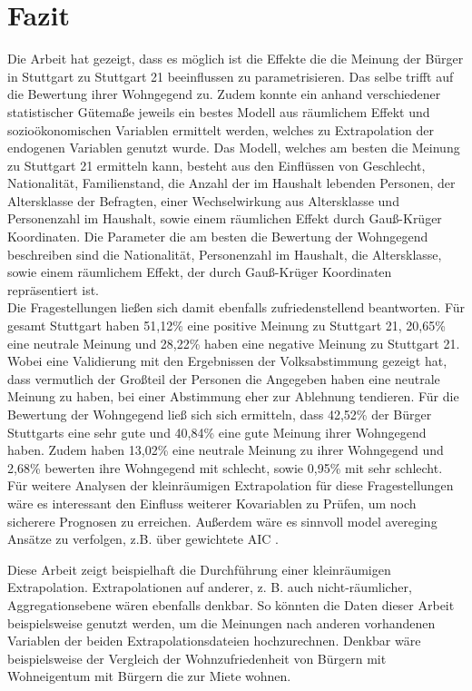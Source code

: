 \documentclass{Vorlage}
\begin{document}
\section{Fazit}
Die Arbeit hat gezeigt, dass es möglich ist die Effekte die die Meinung der Bürger in Stuttgart zu Stuttgart 21 beeinflussen zu parametrisieren. Das selbe trifft auf die Bewertung ihrer Wohngegend zu. Zudem konnte ein anhand verschiedener statistischer Gütemaße jeweils ein bestes Modell aus räumlichem Effekt und sozioökonomischen Variablen ermittelt werden, welches zu Extrapolation der endogenen Variablen genutzt wurde. Das Modell, welches am besten die Meinung zu Stuttgart 21 ermitteln kann, besteht aus den Einflüssen von Geschlecht, Nationalität, Familienstand, die Anzahl der im Haushalt lebenden Personen, der Altersklasse der Befragten, einer Wechselwirkung aus Altersklasse und  Personenzahl im Haushalt, sowie einem räumlichen Effekt durch Gauß-Krüger Koordinaten. Die Parameter die am besten die Bewertung der Wohngegend beschreiben sind die Nationalität, Personenzahl im Haushalt, die Altersklasse, sowie einem räumlichem Effekt, der durch Gauß-Krüger Koordinaten repräsentiert ist. \\
Die Fragestellungen ließen sich damit ebenfalls zufriedenstellend beantworten. Für gesamt Stuttgart haben 51,12\% eine positive Meinung zu Stuttgart 21, 20,65\% eine neutrale Meinung und 28,22\% haben eine negative Meinung zu Stuttgart 21. Wobei eine Validierung mit den Ergebnissen der Volksabstimmung gezeigt hat, dass vermutlich der Großteil der Personen die Angegeben haben eine neutrale Meinung zu haben, bei einer Abstimmung eher zur Ablehnung tendieren. Für die Bewertung der Wohngegend ließ sich sich ermitteln, dass 42,52\% der Bürger Stuttgarts eine sehr gute und 40,84\% eine gute Meinung ihrer Wohngegend haben. Zudem haben 13,02\% eine neutrale Meinung zu ihrer Wohngegend und 2,68\% bewerten ihre Wohngegend mit schlecht, sowie 0,95\% mit sehr schlecht.\\
Für weitere Analysen der kleinräumigen Extrapolation für diese Fragestellungen wäre es interessant den Einfluss weiterer Kovariablen zu Prüfen, um noch sicherere Prognosen zu erreichen. Außerdem wäre es sinnvoll model avereging Ansätze zu verfolgen, z.B. über gewichtete AIC \cite{WAIC}.

Diese Arbeit zeigt beispielhaft die Durchführung einer kleinräumigen Extrapolation. Extrapolationen auf anderer, z. B. auch nicht-räumlicher, Aggregationsebene wären ebenfalls denkbar. So könnten die Daten dieser Arbeit beispielsweise genutzt werden, um die Meinungen nach anderen vorhandenen Variablen der beiden Extrapolationsdateien hochzurechnen. Denkbar wäre beispielsweise der Vergleich der Wohnzufriedenheit von Bürgern mit Wohneigentum mit Bürgern die zur Miete wohnen.
\end{document}
